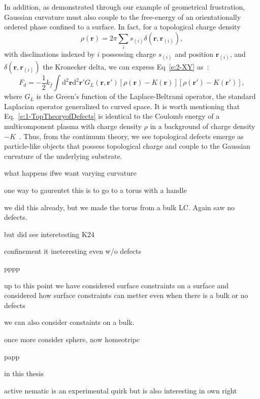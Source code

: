In addition, as demonstrated through our example of geometrical frustration, Gaussian curvature must also couple to the free-energy of an orientationally ordered phase confined to a surface.
In fact, for a topological charge density
\begin{equation}
  \rho(\mathbf{r}) = 2 \pi \sum\limits_i s_{(i)}\delta(\mathbf{r},\mathbf{r}_(i)),
\end{equation}
with disclinations indexed by $i$ possessing charge $s_(i)$ and position $\mathbf{r}_(i)$, and $\delta(\mathbf{r},\mathbf{r}_(i))$ the Kronecker delta, we can express Eq~\ref{e:2-XY} as~\cite{RN42,RN175,RN17}:
\begin{equation}
  F_d = -\frac{1}{2} k_f \int \textrm{d}^2\mathbf{r}\textrm{d}^2\mathbf{r}' G_L(\mathbf{r},\mathbf{r}') [\rho(\mathbf{r})-K(\mathbf{r})] [\rho(\mathbf{r}')-K(\mathbf{r}')],\label{e:1-TopTheoryofDefects}
\end{equation}
where $G_L$ is the Green's function of the Laplace-Beltrami operator, the standard Laplacian operator generalized to curved space.
It is worth mentioning that Eq.~\ref{e:1-TopTheoryofDefects} is identical to the Coulomb energy of a multicomponent plasma with charge density $\rho$ in a background of charge density $-K$~\cite{RN17}.
Thus, from the continuum theory, we see topological defects emerge as particle-like objects that possess topological charge and couple to the Gaussian curvature of the underlying substrate.






what happens ifwe want varying curvature

one way to gaurentet this is to go to a torus with a handle

we did this already, but we made the torus from a bulk LC.  Again saw no defects.

but did see interetesting K24

confinement it ineteresting even w/o defects

pppp

up to this point we have considered surface constraints on a surface and considered how surface constraints can metter even when there is a bulk or no defects


we can also consider constaints on a bulk.

once more consider sphere, now homeotripc

papp

in this thesis


active nematic is an experimental quirk but is also interesting in own right

